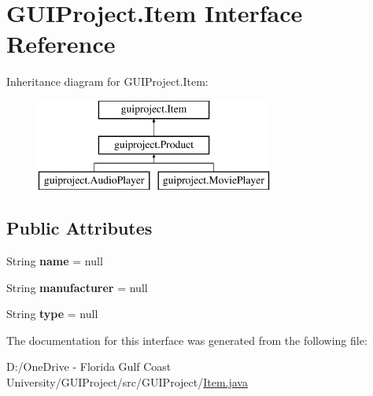 \hypertarget{interface_g_u_i_project_1_1_item}{}\section{G\+U\+I\+Project.\+Item Interface Reference}
\label{interface_g_u_i_project_1_1_item}
Inheritance diagram for G\+U\+I\+Project.\+Item\+:\begin{figure}[H]
\begin{center}
\leavevmode
\includegraphics[height=3.000000cm]{interface_g_u_i_project_1_1_item}
\end{center}
\end{figure}
\subsection*{Public Attributes}
\begin{DoxyCompactItemize}
\item 
\mbox{\label{interface_g_u_i_project_1_1_item_a4278c55c7cb0435ecc850eae75a804f4}} 
String {\bfseries name} = null
\item 
\mbox{\label{interface_g_u_i_project_1_1_item_a8de631f7ef6e90c1e47296d1fe6525cc}} 
String {\bfseries manufacturer} = null
\item 
\mbox{\label{interface_g_u_i_project_1_1_item_a81f9b2cde3fe95a353c92e2164de67b7}} 
String {\bfseries type} = null
\end{DoxyCompactItemize}


The documentation for this interface was generated from the following file\+:\begin{DoxyCompactItemize}
\item 
D\+:/\+One\+Drive -\/ Florida Gulf Coast University/\+G\+U\+I\+Project/src/\+G\+U\+I\+Project/\mbox{\hyperlink{_item_8java}{Item.\+java}}\end{DoxyCompactItemize}

